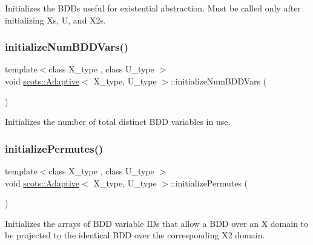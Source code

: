 Initializes the B\+D\+Ds useful for existential abstraction. Must be called only after initializing Xs, U, and X2s. \mbox{\label{classscots_1_1Adaptive_ab75f4bbed30ecc70747185f36fcab200}} 
\subsubsection{\texorpdfstring{initialize\+Num\+B\+D\+D\+Vars()}{initializeNumBDDVars()}}
{\footnotesize\ttfamily template$<$class X\+\_\+type , class U\+\_\+type $>$ \\
void \hyperlink{classscots_1_1Adaptive}{scots\+::\+Adaptive}$<$ X\+\_\+type, U\+\_\+type $>$\+::initialize\+Num\+B\+D\+D\+Vars (\begin{DoxyParamCaption}{ }\end{DoxyParamCaption})\hspace{0.3cm}{\ttfamily [inline]}}

Initializes the number of total distinct B\+DD variables in use. \mbox{\label{classscots_1_1Adaptive_a7351461977b9be0f07ec2974531af677}} 
\subsubsection{\texorpdfstring{initialize\+Permutes()}{initializePermutes()}}
{\footnotesize\ttfamily template$<$class X\+\_\+type , class U\+\_\+type $>$ \\
void \hyperlink{classscots_1_1Adaptive}{scots\+::\+Adaptive}$<$ X\+\_\+type, U\+\_\+type $>$\+::initialize\+Permutes (\begin{DoxyParamCaption}{ }\end{DoxyParamCaption})\hspace{0.3cm}{\ttfamily [inline]}}

Initializes the arrays of B\+DD variable I\+Ds that allow a B\+DD over an X domain to be projected to the identical B\+DD over the corresponding X2 domain. \mbox{\label{classscots_1_1Adaptive_a25cc058f39f38402ff914ae6b927393e}} 
